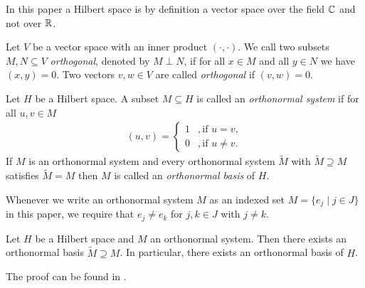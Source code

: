In this paper a Hilbert space is by definition a vector space over the field $\mathbb{C}$ and not over $\mathbb{R}$. 

\begin{definition}
	Let $V$ be a vector space with an inner product $(\cdot, \cdot)$. We call two subsets $M,N \subseteq V$ \textit{orthogonal}, denoted by $M \perp N$, if for all $x \in M$ and all $y \in N$ we have $(x,y) = 0$. Two vectors $v,w \in V$ are called \textit{orthogonal} if $(v,w) = 0$. 
\end{definition}

\begin{definition}
	Let $H$ be a Hilbert space. A subset $M \subseteq H$ is called an \textit{orthonormal system} if for all $u,v \in M$
	\begin{align*}
		(u,v) = 
		\begin{cases}
			1 &, \text{if } u = v, \\
			0 &, \text{if } u \neq v.
		\end{cases}
	\end{align*}
	If $M$ is an orthonormal system and every orthonormal system $\tilde{M}$  with $\tilde{M} \supseteq M$ satisfies $\tilde{M} = M$ then $M$ is called an \textit{orthonormal basis} of $H$.
\end{definition}


\begin{remark}
	Whenever we write an orthonormal system $M$ as an indexed set $M = \{e_j \mid j \in J\}$ in this paper, we require that $e_j \neq e_k$ for $j,k \in J$ with $j \neq k$.
\end{remark}


\begin{lemma}\label{lemma:onb}
	Let $H$ be a Hilbert space and $M$ an orthonormal system. Then there exists an orthonormal basis $\tilde{M} \supseteq M$. In particular, there exists an orthonormal basis of $H$. 
\end{lemma}

The proof can be found in \cite[p.52]{FAna1}.


